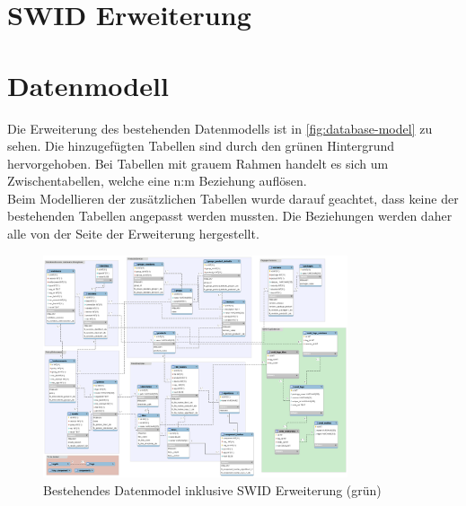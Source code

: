 \section{SWID Erweiterung}
\label{swiderweiterung}

\section{Datenmodell}
Die Erweiterung des bestehenden Datenmodells ist in \autoref{fig:database-model}
zu sehen. Die hinzugefügten Tabellen sind durch den grünen Hintergrund
hervorgehoben. Bei Tabellen mit grauem Rahmen handelt es sich um
Zwischentabellen, welche eine n:m Beziehung auflösen.\\
Beim Modellieren der zusätzlichen Tabellen wurde darauf geachtet, dass keine der
bestehenden Tabellen angepasst werden mussten. Die Beziehungen werden daher alle
von der Seite der Erweiterung hergestellt.

\begin{figure}[H]
	\centering
	\includegraphics[angle=90,width=0.8\textwidth]{./images/db/database-model}
	\caption{Bestehendes Datenmodel inklusive SWID Erweiterung (grün)}
	\label{fig:database-model}
\end{figure}

